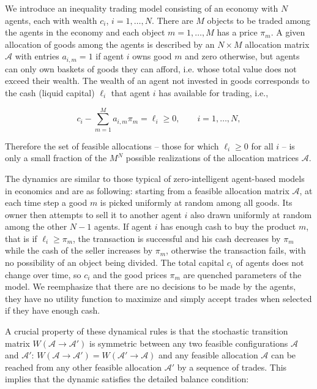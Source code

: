We introduce an inequality trading model consisting of an economy with $N$ agents, each with wealth $c_i$, $ i = 1, \ldots, N$. There are $M$ objects to be traded among the agents in the economy and each object $m = 1, \ldots,M$ has a price $\pi_m$. A given allocation of goods among the agents is described by an $N\times M$ allocation matrix $\mathcal{A}$ with entries $a_{i,m} = 1$ if agent $i$ owns good $m$ and zero otherwise, but agents can only own baskets of goods they can afford, i.e. whose total value does not exceed their wealth. The wealth of an agent not invested in goods corresponds to the cash (liquid capital) $\ell_i$ that agent $i$ has available for trading, i.e.,

\begin{equation}
c_i -  \sum_{m=1}^M a_{i , m} \pi_m =\ell_i\ge 0, \quad\quad i=1,\ldots,N,
\label{eq:1}
\end{equation}

Therefore the set of feasible allocations -- those for which $\ell_i\ge 0$ for all $i$ -- is only a small fraction of the $M^N$ possible realizations of the allocation matrices $\mathcal{A}$. 

The dynamics are similar to those typical of zero-intelligent agent-based models in economics and are as following: starting from a feasible allocation matrix $\mathcal{A}$, at each time step a good $m$ is picked uniformly at random among all goods. Its owner then attempts to sell it to another agent $i$ also drawn uniformly at random among the other $N-1$ agents. If agent $i$ has enough cash to buy the product $m$, that is if $\ell_i \ge \pi_m$, the transaction is successful and his cash decreases by $\pi_m$ while the cash of the seller increases by $\pi_m$, otherwise the transaction fails, with no possibility of an object being divided. The total capital $c_i$ of agents does not change over time, so $c_i$ and the good prices $\pi_m$ are quenched parameters of the model. We reemphasize that there are no decisions to be made by the agents, they have no utility function to maximize and simply accept trades when selected if they have enough cash.

A crucial property of these dynamical rules is that the stochastic transition matrix $W(\mathcal{A}\to\mathcal{A}')$ is symmetric between any two feasible configurations $\mathcal{A}$ and $\mathcal{A}'$: $W(\mathcal{A}\to \mathcal{A}') = W(\mathcal{A}'\to \mathcal{A})$ and any feasible allocation $\mathcal{A}$ can be reached from any other feasible allocation $\mathcal{A}'$ by a sequence of trades. This implies that the dynamic satisfies the detailed balance condition:

